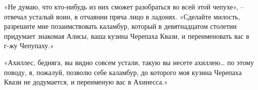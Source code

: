 \documentclass[../main.tex]{subfiles}
\begin{document}
\begin{Dialogue}
«Не думаю, что кто-нибудь из них сможет разобраться во всей этой чепухе», \--- отвечал усталый воин, в отчаянии пряча лицо в ладонях. «Сделайте милость, разрешите мне позаимствовать каламбур, который в девятнадцатом столетии придумает знакомая Алисы, ваша кузина Черепаха Квази, и переименовать вас в г-жу Чепупаху.»

«Ахиллес, бедняга, вы видно совсем устали, такую вы несете ахиллею\ldots{} по этому поводу, я, пожалуй, позволю себе каламбур, до которого моя кузина Черепаха Квази не додумается, и переименую вас в Ахинесса.»

\end{Dialogue}
\end{document}
